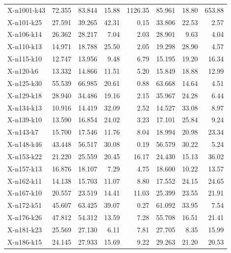 \begin{longtable}{@{}lrrrrrrr@{}}
X-n1001-k43  &     72.355 &      83.844 &  15.88 & 1126.35 &      85.961 &  18.80 & 653.88 \\
X-n101-k25   &     27.591 &      39.265 &  42.31 &   0.15 &      33.806 &  22.53 &   2.57 \\
X-n106-k14   &     26.362 &      28.217 &   7.04 &   2.03 &      28.901 &   9.63 &   4.04 \\
X-n110-k13   &     14.971 &      18.788 &  25.50 &   2.05 &      19.298 &  28.90 &   4.57 \\
X-n115-k10   &     12.747 &      13.956 &   9.48 &   6.79 &      15.195 &  19.20 &  16.34 \\
X-n120-k6    &     13.332 &      14.866 &  11.51 &   5.20 &      15.849 &  18.88 &  12.99 \\
X-n125-k30   &     55.539 &      66.985 &  20.61 &   0.88 &      63.668 &  14.64 &   4.51 \\
X-n129-k18   &     28.940 &      34.486 &  19.16 &   2.15 &      35.967 &  24.28 &   6.44 \\
X-n134-k13   &     10.916 &      14.419 &  32.09 &   2.52 &      14.527 &  33.08 &   8.97 \\
X-n139-k10   &     13.590 &      16.854 &  24.02 &   3.23 &      17.101 &  25.84 &   9.24 \\
X-n143-k7    &     15.700 &      17.546 &  11.76 &   8.04 &      18.994 &  20.98 &  23.34 \\
X-n148-k46   &     43.448 &      56.517 &  30.08 &   0.19 &      56.579 &  30.22 &   5.24 \\
X-n153-k22   &     21.220 &      25.559 &  20.45 &  16.17 &      24.430 &  15.13 &  36.02 \\
X-n157-k13   &     16.876 &      18.107 &   7.29 &   4.75 &      18.600 &  10.22 &  13.57 \\
X-n162-k11   &     14.138 &      15.703 &  11.07 &   8.80 &      17.552 &  24.15 &  24.65 \\
X-n167-k10   &     20.557 &      23.519 &  14.41 &  11.03 &      25.399 &  23.55 &  21.91 \\
X-n172-k51   &     45.607 &      63.425 &  39.07 &   0.27 &      61.092 &  33.95 &   7.54 \\
X-n176-k26   &     47.812 &      54.312 &  13.59 &   7.28 &      55.708 &  16.51 &  21.41 \\
X-n181-k23   &     25.569 &      27.130 &   6.11 &   7.81 &      27.705 &   8.35 &  15.99 \\
X-n186-k15   &     24.145 &      27.933 &  15.69 &   9.22 &      29.263 &  21.20 &  20.53 \\

\end{longtable}
